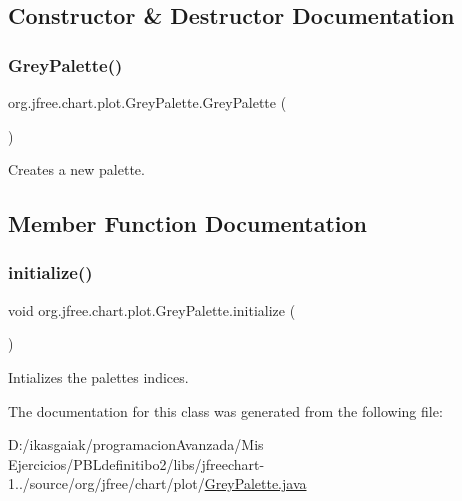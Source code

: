 \subsection{Constructor \& Destructor Documentation}
\mbox{\label{classorg_1_1jfree_1_1chart_1_1plot_1_1_grey_palette_a7afd76f546dd7bbfce3d4196988a7270}} 
\subsubsection{\texorpdfstring{Grey\+Palette()}{GreyPalette()}}
{\footnotesize\ttfamily org.\+jfree.\+chart.\+plot.\+Grey\+Palette.\+Grey\+Palette (\begin{DoxyParamCaption}{ }\end{DoxyParamCaption})}

Creates a new palette. 

\subsection{Member Function Documentation}
\mbox{\label{classorg_1_1jfree_1_1chart_1_1plot_1_1_grey_palette_a302469ee674b8824a36b6bb6e44d6909}} 
\subsubsection{\texorpdfstring{initialize()}{initialize()}}
{\footnotesize\ttfamily void org.\+jfree.\+chart.\+plot.\+Grey\+Palette.\+initialize (\begin{DoxyParamCaption}{ }\end{DoxyParamCaption})}

Intializes the palette\textquotesingle{}s indices. 

The documentation for this class was generated from the following file\+:\begin{DoxyCompactItemize}
\item 
D\+:/ikasgaiak/programacion\+Avanzada/\+Mis Ejercicios/\+P\+B\+Ldefinitibo2/libs/jfreechart-\/1../source/org/jfree/chart/plot/\mbox{\hyperlink{_grey_palette_8java}{Grey\+Palette.\+java}}\end{DoxyCompactItemize}
